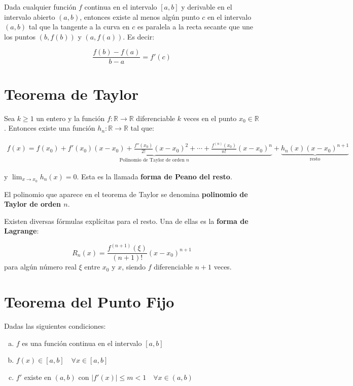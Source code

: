 \documentclass[openany]{book}
\begin{document}
Dada cualquier función \(f\) continua en el intervalo \([a, b]\) y derivable en el intervalo abierto \((a, b)\), entonces existe al menos algún punto \(c\) en el intervalo \((a, b)\) tal que la tangente a la curva en \(c\) es paralela a la recta secante que une los puntos \((b, f(b))\) y \((a, f(a))\). Es decir:

\[
{\displaystyle {\frac {f(b)-f(a)}{b-a}}=f'(c)} 
\]

\hypertarget{teorema-de-taylor}{%
\section*{Teorema de Taylor}\label{teorema-de-taylor}}

Sea \(k \geq 1\) un entero y la función \(f:\mathbb{R} \rightarrow \mathbb{R}\) diferenciable \(k\) veces en el punto \(x_0 \in \mathbb{R}\). Entonces existe una función \(h_n: \mathbb{R} \rightarrow \mathbb{R}\) tal que:

\begin{gather*}
f(x) =
\underbrace{f(x_0) + f'(x_0)(x-x_0) + {\frac{f''(x_0)}{2!}} (x-x_0)^{2} + \cdots + {\frac{f^{(n)}(x_0)}{n!}}(x-x_0)^{n}}_{\text{Polinomio de Taylor de orden $n$}} + 
\underbrace{h_{n}(x)(x-x_0)^{n+1}}_{\text{resto}}
\end{gather*}

y \(\lim_{x \to x_0} h_n(x)=0\). Esta es la llamada \textbf{forma de Peano del resto}.

El polinomio que aparece en el teorema de Taylor se denomina \textbf{polinomio de Taylor de orden \(n\)}.

Existen diversas fórmulas explícitas para el resto. Una de ellas es la \textbf{forma de Lagrange}:

\[ R_{n}(x) = {\frac {f^{(n+1)}(\xi)}{(n+1)!}}(x-x_0)^{n+1} \]
para algún número real \(\xi\) entre \(x_0\) y \(x\), siendo \(f\) diferenciable \(n+1\) veces.

\hypertarget{teorema-del-punto-fijo-1}{%
\section*{Teorema del Punto Fijo}\label{teorema-del-punto-fijo-1}}

Dadas las siguientes condiciones:

\begin{enumerate}[(a)]
\item $f$ es una función continua en el intervalo $[a, b]$
\item $f(x) \in [a, b] \quad \forall x \in [a, b]$
\item $f'$ existe en $(a, b)$ con $|f'(x)| \le m < 1 \quad \forall x \in (a, b)$
\end{enumerate}
\end{document}
